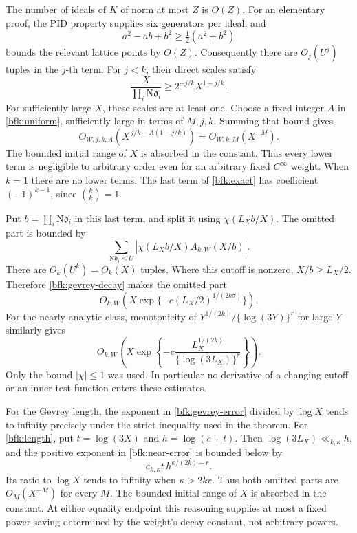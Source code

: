 The number of ideals of \(K\) of norm at most \(Z\) is \(O(Z)\).
For an elementary proof, the PID property supplies six generators
per ideal, and
\[
 a^2-ab+b^2\ge\tfrac12(a^2+b^2)
\]
bounds the relevant lattice points by \(O(Z)\).
Consequently there are \(O_j(U^j)\) tuples in the \(j\)-th term.
For \(j<k\), their direct scales satisfy
\[
 \frac X{\prod_i\mathrm N\mathfrak d_i}
 \ge 2^{-j/k}X^{1-j/k}.
\]
For sufficiently large \(X\), these scales are at least one.
Choose a fixed integer \(A\) in \eqref{bfk:uniform}, sufficiently
large in terms of \(M,j,k\).  Summing that bound gives
\[
 O_{W,j,k,A}\left(X^{\,j/k-A(1-j/k)}\right)
   =O_{W,k,M}(X^{-M}).
\]
The bounded initial range of \(X\) is absorbed in the constant.
Thus every lower term is negligible to arbitrary order even for
an arbitrary fixed \(C^\infty\) weight.  When \(k=1\) there are no
lower terms.  The last term of \eqref{bfk:exact} has coefficient
\((-1)^{k-1}\), since \(\binom{k}{k}=1\).

Put \(b=\prod_i\mathrm N\mathfrak d_i\) in this last term, and
split it using \(\chi(L_X b/X)\).
The omitted part is bounded by
\[
 \sum_{\mathrm N\mathfrak d_i\le U}
    \left|\chi(L_X b/X)A_{k,W}(X/b)\right|.
\]
There are \(O_k(U^k)=O_k(X)\) tuples.  Where this cutoff is
nonzero, \(X/b\ge L_X/2\).  Therefore
\eqref{bfk:gevrey-decay} makes the omitted part
\begin{equation}
 O_{k,W}\left(
       X\exp\{-c(L_X/2)^{1/(2k\sigma)}\}\right).
 \label{bfk:gevrey-error}
\end{equation}
For the nearly analytic class, monotonicity of
\(Y^{1/(2k)}/\{\log(3Y)\}^r\) for large \(Y\) similarly gives
\begin{equation}
 O_{k,W}\left(
       X\exp\left\{-c\frac{L_X^{1/(2k)}}
                              {\{\log(3L_X)\}^r}\right\}\right).
 \label{bfk:near-error}
\end{equation}
Only the bound \(|\chi|\le1\) was used.  In particular no
derivative of a changing cutoff or an inner test function enters
these estimates.

For the Gevrey length, the exponent in
\eqref{bfk:gevrey-error} divided by \(\log X\) tends to infinity
precisely under the strict inequality used in the theorem.
For \eqref{bfk:length}, put \(t=\log(3X)\) and \(h=\log(e+t)\).
Then \(\log(3L_X)\ll_{k,\kappa}h\), and the positive exponent
in \eqref{bfk:near-error} is bounded below by
\[
 c_{k,\kappa}t\,h^{\kappa/(2k)-r}.
\]
Its ratio to \(\log X\) tends to infinity when \(\kappa>2kr\).
Thus both omitted parts are \(O_M(X^{-M})\) for every \(M\).
The bounded initial range of \(X\) is absorbed in the constant.
At either equality endpoint this reasoning supplies at most a
fixed power saving determined by the weight's decay constant,
not arbitrary powers.

